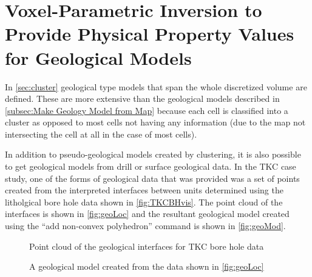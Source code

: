 \section{Voxel-Parametric Inversion to Provide Physical Property Values for Geological Models}
\label{sec:voxelParam}

In \autoref{sec:cluster} geological type models that span the whole discretized volume are defined. These are more extensive than the geological models described in \autoref{subsec:Make Geology Model from Map} because each cell is classified into a cluster as opposed to most cells not having any information (due to the map not intersecting the cell at all in the case of most cells).

In addition to pseudo-geological models created by clustering, it is also possible to get geological models from drill or surface geological data. In the TKC case study, one of the forms of geological data that was provided was a set of points created from the interpreted interfaces between units determined using the litholgical bore hole data shown in \autoref{fig:TKCBHvis}. The point cloud of the interfaces is shown in \autoref{fig:geoLoc} and the resultant geological model created using the ``add non-convex polyhedron'' command is shown in \autoref{fig:geoMod}.

\begin{figure} [h]
    \centering
    \caption{Point cloud of the geological interfaces for TKC bore hole data}
    \label{fig:geoLoc}
\end{figure}

\begin{figure} [h]
    \centering
    \caption{A geological model created from the data shown in \autoref{fig:geoLoc}}
    \label{fig:geoMod}
\end{figure}

